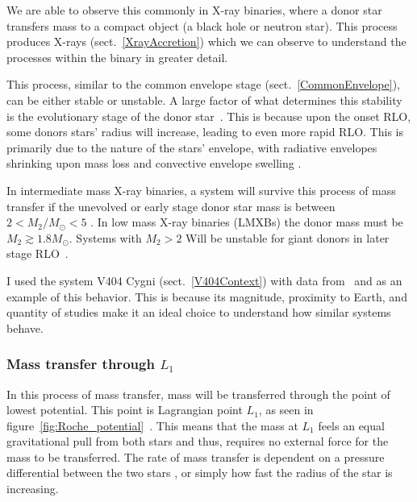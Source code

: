 \documentclass[12pt, a4paper]{article}
\begin{document}
        We are able to observe this commonly in X-ray binaries, where a donor star transfers mass to a compact object (a black hole or neutron star). This process produces X-rays (sect.~\ref{XrayAccretion}) which we can observe to understand the processes within the binary in greater detail.

        This process, similar to the common envelope stage (sect.~\ref{CommonEnvelope}), can be either stable or unstable. A large factor of what determines this stability is the evolutionary stage of the donor star~\parencite{TaurisvandenHeuvel+2023}. This is because upon the onset RLO, some donors stars' radius will increase, leading to even more rapid RLO. This is primarily due to the nature of the stars' envelope, with radiative envelopes shrinking upon mass loss and convective envelope swelling \parencite{TaurisvandenHeuvel+2023}.
        
        In intermediate mass X-ray binaries, a system will survive this process of mass transfer if the unevolved or early stage donor star mass is between $2 < M_2/M_\odot < 5$ \parencite{TaurisvandenHeuvel+2023}. In low mass X-ray binaries (LMXBs) the donor mass must be $M_2 \gtrsim 1.8 M_\odot$. Systems with $M_2 > 2$ Will be unstable for giant donors in later stage RLO~\parencite{TaurisvandenHeuvel+2023}.
        
        I used the system V404 Cygni (sect.~\ref{V404Context}) with data from~\parencite{Bernardini_2016} and \parencite{Shahbaz_1994} as an example of this behavior. This is because its magnitude, proximity to Earth, and quantity of studies make it an ideal choice to understand how similar systems behave. 

        \subsubsection{Mass transfer through $L_1$} \label{L1MassTransfer}

        In this process of mass transfer, mass will be transferred through the point of lowest potential. This point is Lagrangian point $L_1$, as seen in figure~\ref{fig:Roche_potential}~\parencite{TaurisvandenHeuvel+2023}. This means that the mass at $L_1$ feels an equal gravitational pull from both stars and thus, requires no external force for the mass to be transferred. The rate of mass transfer is dependent on a pressure differential between the two stars \parencite{TaurisvandenHeuvel+2023}, or simply how fast the radius of the star is increasing.
\end{document}

